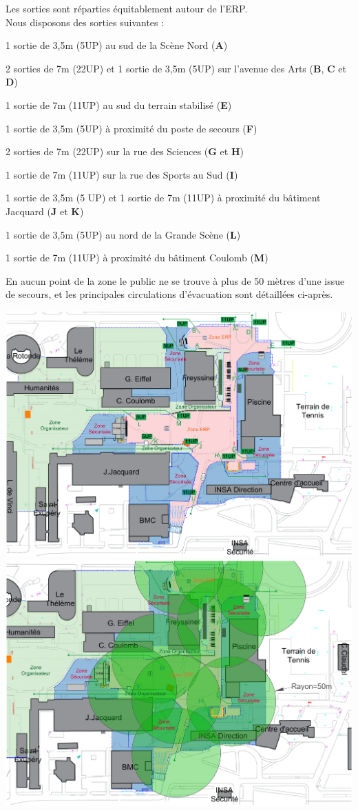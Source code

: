 \documentclass[hidelinks, paper=a4, fontsize=13pt]{report}
\begin{document}
Les sorties sont réparties équitablement autour de l’ERP. \\

Nous disposons des sorties suivantes : 
\begin{list}{•}{}
	\item1 sortie de 3,5m (5UP) au sud de la Scène Nord (\textbf{A}) 
	\item2 sorties de 7m (22UP) et 1 sortie de 3,5m (5UP) sur l’avenue des Arts (\textbf{B}, \textbf{C} et \textbf{D})
	\item1 sortie de 7m (11UP) au sud du terrain stabilisé (\textbf{E})
	\item1 sortie de 3,5m (5UP) à proximité du poste de secours (\textbf{F})
	\item2 sorties de 7m (22UP) sur la rue des Sciences (\textbf{G} et \textbf{H})
	\item1 sortie de 7m (11UP) sur la rue des Sports au Sud (\textbf{I})
	\item1 sortie de 3,5m (5 UP) et 1 sortie de 7m (11UP) à proximité du bâtiment Jacquard (\textbf{J} et \textbf{K})
	\item1 sortie de 3,5m (5UP) au nord de la Grande Scène (\textbf{L})
	\item1 sortie de 7m (11UP) à proximité du bâtiment Coulomb (\textbf{M})
\end{list}

En aucun point de la zone le public ne se trouve à plus de 50 mètres d’une issue de secours, et les principales circulations d’évacuation sont détaillées ci-après. 

\begin{center}
	\includegraphics[width=1\textwidth,keepaspectratio, angle=90]{Exports/Plan_24h_44eme-IS}
	\includegraphics[width=.8\textwidth,keepaspectratio, angle=90]{Exports/Plan_24h_44eme-Cercles}
\end{center}
\end{document}
